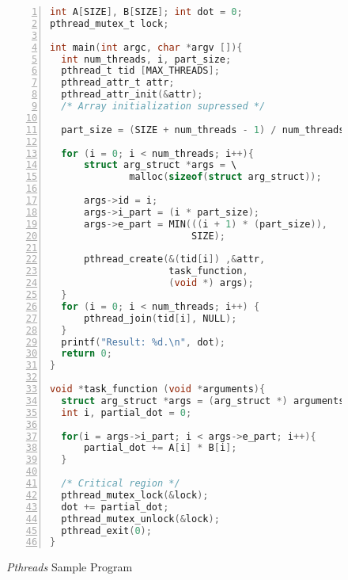 \begin{figure}[htb]
\begin{minipage}{\linewidth}
\begin{lstlisting}[language=C, basicstyle=\ttfamily\scriptsize, numbers=left,
                   frame=no, showspaces=false, showstringspaces=false,
                   numberstyle=\tiny,
                   xleftmargin=0.5cm,
                   keywords={%
                       DATATYPE, pthread_t, pthread_create,
                       pthread_join, task_function, NULL, int, main,
                       void, printf, return, pthread_mutex_t,
                       pthread_attr_t, pthread_attr_init,
                       MAX_THREADS, SIZE, char, struct, malloc,
                       MIN, pthread_mutex_lock, pthread_mutex_unlock,
                       pthread_exit%
                       },
                   otherkeywords={::, \#pragma, \#include, <<<,>>>, \&, \*, +, -, /, [, ], >, <}
                   ]
int A[SIZE], B[SIZE]; int dot = 0;
pthread_mutex_t lock;

int main(int argc, char *argv []){
  int num_threads, i, part_size;
  pthread_t tid [MAX_THREADS];
  pthread_attr_t attr;
  pthread_attr_init(&attr);
  /* Array initialization supressed */

  part_size = (SIZE + num_threads - 1) / num_threads;

  for (i = 0; i < num_threads; i++){
      struct arg_struct *args = \
              malloc(sizeof(struct arg_struct));

      args->id = i;
      args->i_part = (i * part_size);
      args->e_part = MIN(((i + 1) * (part_size)),
                         SIZE);

      pthread_create(&(tid[i]) ,&attr,
                     task_function,
                     (void *) args);
  }
  for (i = 0; i < num_threads; i++) {
      pthread_join(tid[i], NULL);
  }
  printf("Result: %d.\n", dot);
  return 0;
}

void *task_function (void *arguments){
  struct arg_struct *args = (arg_struct *) arguments;
  int i, partial_dot = 0;

  for(i = args->i_part; i < args->e_part; i++){
      partial_dot += A[i] * B[i];
  }

  /* Critical region */
  pthread_mutex_lock(&lock);
  dot += partial_dot;
  pthread_mutex_unlock(&lock);
  pthread_exit(0);
}
\end{lstlisting}
\end{minipage}
\caption{\textit{Pthreads} Sample Program}
\label{lst:pthreads}
\end{figure}

